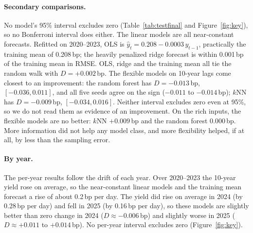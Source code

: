 \documentclass{article}
\newcommand{\gentable}[2][\small]{{#1\setlength{\tabcolsep}{4pt}}}
\begin{document}
\begin{table}[t]
  \caption{Final study: the 2024--2025 test ($n = 499$ days; 250 in 2024, 249 in 2025), scored once. RMSE and $D$ in bp; $D$ is the model's RMSE minus the zero-change RMSE (negative favors the model). Intervals: paired circular block bootstrap, 20-day blocks, 10,000 resamples. The lasso is the pre-registered primary comparison; the Bonferroni intervals (level $1-0.05/7$) correct the seven secondary comparisons. Every interval contains zero.}
  \label{tab:testfinal}
  \centering
  \gentable[\footnotesize]{tab_testfinal}
\end{table}

\paragraph{Secondary comparisons.} No model's 95\% interval excludes zero (Table~\ref{tab:testfinal} and Figure~\ref{fig:key}), so no Bonferroni interval does either. The linear models are all near-constant forecasts. Refitted on 2020--2023, OLS is $\widehat y_t = 0.208 - 0.0003\,y_{t-1}$, practically the training mean of 0.208\,bp; the heavily penalized ridge forecast is within 0.001\,bp of the training mean in RMSE. OLS, ridge and the training mean all tie the random walk with $D = +0.002$\,bp. The flexible models on 10-year lags come closest to an improvement: the random forest has $D = -0.013$\,bp, $[-0.036, 0.011]$, and all five seeds agree on the sign ($-0.011$ to $-0.014$\,bp); $k$NN has $D = -0.009$\,bp, $[-0.034, 0.016]$. Neither interval excludes zero even at 95\%, so we do not read them as evidence of an improvement. On the rich inputs, the flexible models are no better: $k$NN $+0.009$\,bp and the random forest $0.000$\,bp. More information did not help any model class, and more flexibility helped, if at all, by less than the sampling error.

\paragraph{By year.} The per-year results follow the drift of each year. Over 2020--2023 the 10-year yield rose on average, so the near-constant linear models and the training mean forecast a rise of about 0.2\,bp per day. The yield did rise on average in 2024 (by 0.28\,bp per day) and fell in 2025 (by 0.16\,bp per day), so these models are slightly better than zero change in 2024 ($D \approx -0.006$\,bp) and slightly worse in 2025 ($D \approx +0.011$ to $+0.014$\,bp). No per-year interval excludes zero (Figure~\ref{fig:key}).
\end{document}
